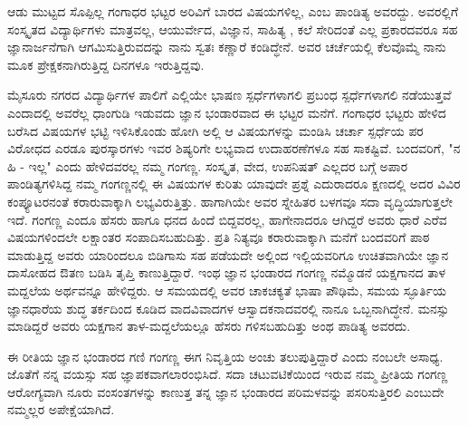 {ಆಡು ಮುಟ್ಟದ ಸೊಪ್ಪಿಲ್ಲ ಗಂಗಾಧರ ಭಟ್ಟರ ಅರಿವಿಗೆ ಬಾರದ ವಿಷಯಗಳಿಲ್ಲ, ಎಂಬ ಪಾಂಡಿತ್ಯ ಅವರದ್ದು.  ಅವರಲ್ಲಿಗೆ ಸಂಸ್ಕೃತದ ವಿದ್ಯಾರ್ಥಿಗಳು ಮಾತ್ರವಲ್ಲ, ಆಯುರ್ವೇದ, ವಿಜ್ಞಾನ, ಸಾಹಿತ್ಯ , ಕಲೆ ಸೇರಿದಂತೆ  ಎಲ್ಲ ಪ್ರಕಾರದವರೂ ಸಹ ಜ್ಞಾನಾರ್ಜನೆಗಾಗಿ ಆಗಮಿಸುತ್ತಿರುವದನ್ನು ನಾನು ಸ್ವತಃ ಕಣ್ಣಾರೆ  ಕಂಡಿದ್ಧೇನೆ. ಅವರ ಚರ್ಚೆಯಲ್ಲಿ ಕೆಲವೊಮ್ಮೆ ನಾನು  ಮೂಕ ಪ್ರೇಕ್ಷಕನಾಗಿರುತ್ತಿದ್ದ ದಿನಗಳೂ ಇರುತ್ತಿದ್ದವು.

ಮೈಸೂರು ನಗರದ ವಿದ್ಯಾರ್ಥಿಗಳ ಪಾಲಿಗೆ ಎಲ್ಲಿಯೇ ಭಾಷಣ ಸ್ಪರ್ಧೆಗಳಾಗಲಿ  ಪ್ರಬಂಧ ಸ್ಪರ್ಧೆಗಳಾಗಲಿ  ನಡೆಯುತ್ತವೆ ಎಂದಾದಲ್ಲಿ   ಅವರೆಲ್ಲ ಧಾಂಗುಡಿ ಇಡುವದು ಜ್ಞಾನ ಭಂಡಾರವಾದ ಈ ಭಟ್ಟರ ಮನೆಗೆ. ಗಂಗಾಧರ ಭಟ್ಟರು ಹೇಳಿದ  ಬರೆಸಿದ ವಿಷಯಗಳ ಭಟ್ಟಿ ಇಳಿಸಿಕೊಂಡು ಹೋಗಿ   ಅಲ್ಲಿ ಆ ವಿಷಯಗಳನ್ನು  ಮಂಡಿಸಿ   ಚರ್ಚಾ ಸ್ಪರ್ಧೆಯ ಪರ ವಿರೋಧದ ಎರಡೂ ಪುರಸ್ಕಾರಗಳು ಇವರ  ಶಿಷ್ಯರಿಗೇ ಲಭ್ಯವಾದ ಉದಾಹರಣೆಗಳೂ ಸಹ ಸಾಕಷ್ಟಿವೆ. ಬಂದವರಿಗೆ, "ನ ಹಿ - ಇಲ್ಲ" ಎಂದು ಹೇಳಿದವರಲ್ಲ  ನಮ್ಮ ಗಂಗಣ್ಣ.  ಸಂಸ್ಕೃತ, ವೇದ, ಉಪನಿಷತ್ ಎಲ್ಲದರ ಬಗ್ಗೆ ಅಪಾರ ಪಾಂಡಿತ್ಯಗಳಿಸಿದ್ದ ನಮ್ಮ ಗಂಗಣ್ಣನಲ್ಲಿ ಈ ವಿಷಯಗಳ ಕುರಿತು ಯಾವುದೇ  ಪ್ರಶ್ನೆ ಎದುರಾದರೂ ಕ್ಷಣದಲ್ಲಿ ಅದರ ವಿವಿರ ಕಂಪ್ಯೂಟರನಂತೆ ಕರಾರುವಾಕ್ಕಾಗಿ ಲಭ್ಯವಿರುತ್ತಿತ್ತು. ಹಾಗಾಗಿಯೇ ಅವರ ಸ್ನೇಹಿತರ ಬಳಗವೂ ಸದಾ ವೃದ್ಧಿಯಾಗುತ್ತಲೇ ಇದೆ. 
ಗಂಗಣ್ಣ ಎಂದೂ ಹೆಸರು ಹಾಗೂ ಧನದ ಹಿಂದೆ ಬಿದ್ದವರಲ್ಲ, ಹಾಗೇನಾದರೂ ಆಗಿದ್ದರೆ ಅವರು ಧಾರೆ ಎರೆವ  ವಿಷಯಗಳಿಂದಲೇ  ಲಕ್ಷಾಂತರ ಸಂಪಾದಿಸಬಹುದಿತ್ತು. ಪ್ರತಿ ನಿತ್ಯವೂ ಕರಾರುವಾಕ್ಕಾಗಿ ಮನೆಗೆ ಬಂದವರಿಗೆ ಪಾಠ ಮಾಡುತ್ತಿದ್ದ ಅವರು ಯಾರಿಂದಲೂ ಬಿಡಿಗಾಸು ಸಹ ಪಡೆಯದೇ ಅಲ್ಲಿಂದ ಇಲ್ಲಿಯವರಿಗೂ ಉಚಿತವಾಗಿಯೇ ಜ್ಞಾನ ದಾಸೋಹದ ಔತಣ  ಬಡಿಸಿ ತೃಪ್ತಿ ಕಾಣುತ್ತಿದ್ದಾರೆ.
ಇಂಥ ಜ್ಞಾನ ಭಂಡಾರದ ಗಂಗಣ್ಣ  ನಮ್ಮೊಡನೆ ಯಕ್ಷಗಾನದ ತಾಳ ಮದ್ದಲೆಯ ಅರ್ಥವನ್ನೂ ಹೇಳಿದ್ದರು. ಆ ಸಮಯದಲ್ಲಿ ಅವರ ಚಾಕಚಕ್ಯತೆ ಭಾಷಾ ಪೌಢಿಮೆ, ಸಮಯ ಸ್ಫೂರ್ತಿಯ ಜ್ಞಾನಧಾರೆಯ ಶುದ್ಧ ತರ್ಕದಿಂದ ಕೂಡಿದ  ವಾದವಿವಾದಗಳ ಆಸ್ವಾದಕನಾದವರಲ್ಲಿ ನಾನೂ ಒಬ್ಬನಾಗಿದ್ಧೇನೆ. ಮನಸ್ಸು ಮಾಡಿದ್ದರೆ ಅವರು ಯಕ್ಷಗಾನ ತಾಳ-ಮದ್ದಲೆಯಲ್ಲೂ ಹೆಸರು ಗಳಿಸಬಹುದಿತ್ತು ಅಂಥ ಪಾಡಿತ್ಯ ಅವರದು.  

ಈ ರೀತಿಯ ಜ್ಞಾನ ಭಂಡಾರದ ಗಣಿ ಗಂಗಣ್ಣ ಈಗ ನಿವೃತ್ತಿಯ ಅಂಚು ತಲುಪುತ್ತಿದ್ದಾರೆ ಎಂದು ನಂಬಲೇ ಅಸಾಧ್ಯ. ಜೊತೆಗೆ ನನ್ನ ವಯಸ್ಸು  ಸಹ ಜ್ಞಾಪಕವಾಗಲಾರಂಭಿಸಿದೆ. ಸದಾ ಚಟುವಟಿಕೆಯಿಂದ ಇರುವ ನಮ್ಮ ಪ್ರೀತಿಯ ಗಂಗಣ್ಣ  ಆರೋಗ್ಯವಾಗಿ  ನೂರು ವಂಸಂತಗಳನ್ನು  ಕಾಣುತ್ತ  ತನ್ನ ಜ್ಞಾನ ಭಂಡಾರದ ಪರಿಮಳವನ್ನು ಪಸರಿಸುತ್ತಿರಲಿ ಎಂಬುದೇ ನಮ್ಮಲ್ಲರ ಅಪೇಕ್ಷೆಯಾಗಿದೆ.


\articleend
}
